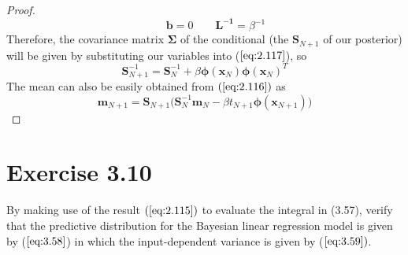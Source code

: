 \begin{proof}
\begin{equation*}
        \hspace{2em}
        \mathbf{b} = 0
        \hspace{2em}
        \mathbf{L^{-1}} = \beta^{-1}
    \end{equation*}
    Therefore, the covariance matrix $\mathbf{\Sigma}$ of the conditional (the $\mathbf{S}_{N + 1}$ 
    of our posterior) will be given by substituting our variables into ($\ref{eq:2.117}$), so
    \begin{equation*}
        \mathbf{S}_{N + 1}^{-1} = \mathbf{S}_N^{-1} + \beta \bm{\phi}(\mathbf{x}_N)\bm{\phi}(\mathbf{x}_N)^T
    \end{equation*}
    The mean can also be easily obtained from $(\ref{eq:2.116})$ as
    \begin{equation*}
        \mathbf{m}_{N + 1}
        = \mathbf{S}_{N + 1}\big(\mathbf{S}_N^{-1} \mathbf{m}_N 
             - \beta t_{N + 1} \bm{\phi}(\mathbf{x}_{N + 1})\big)
    \end{equation*}
\end{proof}

\section*{Exercise 3.10}
By making use of the result $(\ref{eq:2.115})$ to evaluate the integral
in (3.57), verify that the predictive distribution for the Bayesian linear
regression model is given by ($\ref{eq:3.58}$) in which the input-dependent variance is
given by ($\ref{eq:3.59})$.

\vspace{1em}

